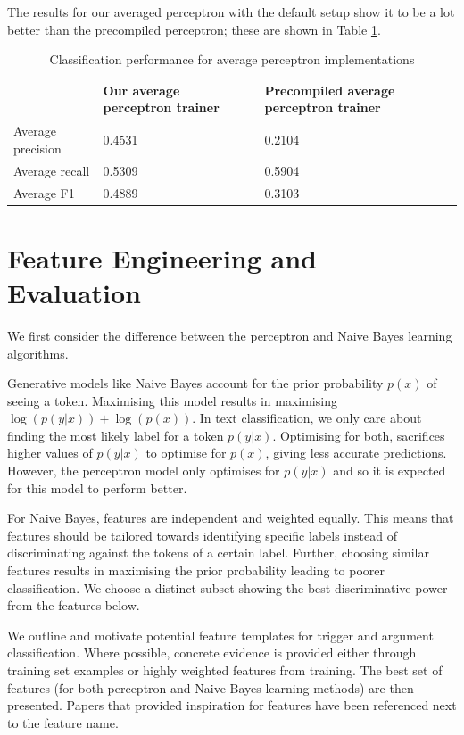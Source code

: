 \documentclass{article} %
\begin{document}
The results for our averaged perceptron with the default setup show it to be a lot better than the precompiled perceptron; these are shown in Table \ref{table:2_perf}.

\begin{table}[htb]
\centering
\caption{Classification performance for average perceptron implementations}
\label{table:2_perf}
\begin{tabular}{l|l|l|}
\cline{2-3}
                                        & Our average perceptron trainer & Precompiled average perceptron trainer \\ \hline
\multicolumn{1}{|l|}{Average precision} & 0.4531                       & 0.2104                    \\ \hline
\multicolumn{1}{|l|}{Average recall}    & 0.5309             & 0.5904                     \\ \hline
\multicolumn{1}{|l|}{Average F1}        & 0.4889            & 0.3103                    \\ \hline
\end{tabular}
\end{table}


\section{Feature Engineering and Evaluation}

We first consider the difference between the perceptron and Naive Bayes learning algorithms.

Generative models like Naive Bayes account for the prior probability $p(x)$ of seeing a token. Maximising this model results in maximising $\log(p(y|x)) + \log(p(x))$. In text classification, we only care about finding the most likely label for a token $p(y|x)$. Optimising for both, sacrifices higher values of $p(y|x)$ to optimise for $p(x)$, giving less accurate predictions. However, the perceptron model only optimises for $p(y|x)$ and so it is expected for this model to perform better.

For Naive Bayes, features are independent and weighted equally. This means that features should be tailored towards identifying specific labels instead of discriminating against the tokens of a certain label. Further, choosing similar features results in maximising the prior probability leading to poorer classification. We choose a distinct subset showing the best discriminative power from the features below.

We outline and motivate potential feature templates for trigger and argument classification. Where possible, concrete evidence is provided either through training set examples or highly weighted features from training. The best set of features (for both perceptron and Naive Bayes learning methods) are then presented.
Papers that provided inspiration for features have been referenced next to the feature name.
\end{document}
